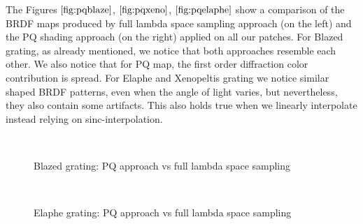 The Figures $\ref{fig:pqblaze}$, $\ref{fig:pqxeno}$, $\ref{fig:pqelaphe}$ show a comparison of the BRDF maps produced by full lambda space sampling approach (on the left) and the PQ shading approach (on the right) applied on all our patches. For Blazed grating, as already mentioned, we notice that both approaches resemble each other. We also notice that for PQ map, the first order diffraction color contribution is spread. For Elaphe and Xenopeltis grating we notice similar shaped BRDF patterns, even when the angle of light varies, but nevertheless, they also contain some artifacts. This also holds true when we linearly interpolate instead relying on sinc-interpolation.

\begin{figure}[H]
  \centering
~
~
  
\caption{Blazed grating: PQ approach vs full lambda space sampling}
\label{fig:pqblaze}
\end{figure}

\begin{figure}[H]
  \centering
~

  
\caption{Elaphe grating: PQ approach vs full lambda space sampling}
\label{fig:pqelaphe}
\end{figure}

